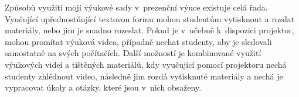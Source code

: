 Způsobů využití mojí výukové sady v~prezenční výuce existuje celá řada.
Vyučující upřednostňující textovou formu mohou studentům vytisknout a rozdat materiály, nebo jim je snadno rozeslat.
Pokud je v~učebně k~dispozici projektor, mohou promítat výuková videa, případně nechat studenty, aby je sledovali samostatně na svých počítačích.
Další možností je kombinované využití výukových videí a tištěných materiálů, kdy vyučující pomocí projektoru nechá studenty zhlédnout video, následně jim rozdá vytisknuté materiály a nechá je vypracovat úkoly a otázky, které jsou v~nich obsaženy.